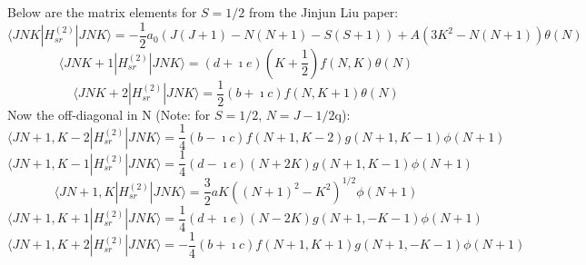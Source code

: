 \documentclass{article}
\begin{document}
Below are the matrix elements for $S=1/2$ from the Jinjun Liu paper:
\begin{equation}\label{sr0k0n}
\langle JNK|H_{sr}^{(2)}|JNK\rangle = -\frac{1}{2}a_{0}(J(J+1)-N(N+1)-S(S+1)) + A(3K^{2}-N(N+1))\theta(N)
\end{equation}
\color{red}
\begin{equation}\label{sr1k0n}
\langle JNK+1|H_{sr}^{(2)}|JNK\rangle = (d+\imath e)(K+\frac{1}{2})f(N,K)\theta(N)
\end{equation}
\color{blue}
\begin{equation}\label{sr2k0n}
\langle JNK+2|H_{sr}^{(2)}|JNK\rangle = \frac{1}{2}(b+\imath c)f(N,K+1)\theta(N)
\end{equation}
\color{black}
Now the off-diagonal in N (Note: for $S=1/2$, $N=J-1/2$q):
\color{purple}
\begin{equation}\label{srm2k1n}
\langle JN+1,K-2|H_{sr}^{(2)}|JNK\rangle = \frac{1}{4}(b-\imath c)f(N+1,K-2)g(N+1,K-1)\phi(N+1)
\end{equation}
\color{zgreen}
\begin{equation}\label{srm1k1n}
\langle JN+1,K-1|H_{sr}^{(2)}|JNK\rangle = \frac{1}{4}(d-\imath e)(N+2K)g(N+1,K-1)\phi(N+1)
\end{equation}
\color{black}
\begin{equation}\label{sr0k1n}
\langle JN+1,K|H_{sr}^{(2)}|JNK\rangle = \frac{3}{2}aK((N+1)^{2}-K^{2})^{1/2}\phi(N+1)
\end{equation}
\color{red}
\begin{equation}\label{sr1k1n}
\langle JN+1,K+1|H_{sr}^{(2)}|JNK\rangle = \frac{1}{4}(d+\imath e)(N-2K)g(N+1,-K-1)\phi(N+1)
\end{equation}
\color{blue}
\begin{equation}\label{sr2k1n}
\langle JN+1,K+2|H_{sr}^{(2)}|JNK\rangle = -\frac{1}{4}(b+\imath c)f(N+1,K+1)g(N+1,-K-1)\phi(N+1)
\end{equation}
\color{black}
\end{document}
